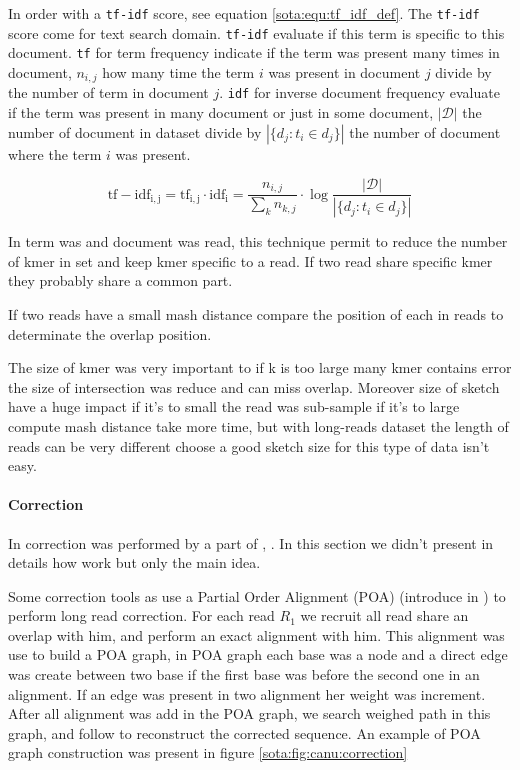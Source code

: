 \documentclass[main]{subfiles}
\begin{document}
In \mhap order \kmer with a \texttt{tf-idf} score, see equation \ref{sota:equ:tf_idf_def}. The \texttt{tf-idf} score come for text search domain. \texttt{tf-idf} evaluate if this term is specific to this document. \texttt{tf} for term frequency indicate if the term was present many times in document, $n_{i,j}$ how many time the term $i$ was present in document $j$ divide by the number of term in document $j$. \texttt{idf} for inverse document frequency evaluate if the term was present in many document or just in some document, $|\mathcal{D}|$ the number of document in dataset divide by $|\{d_{j}:t_{i}\in d_{j}\}|$ the number of document where the term $i$ was present.

\begin{equation}
\mathrm{tf-idf_{i,j}} = \mathrm{tf_{i,j}} \cdot \mathrm{idf_{i}} = \frac{n_{i,j}}{\sum_{k}n_{k,j}} \cdot \log{\frac  {|\mathcal{D}|}{|\{d_{j}:t_{i}\in d_{j}\}|}}
\label{sota:equ:tf_idf_def}
\end{equation}

In \mhap term was \kmer and document was read, this technique permit to reduce the number of kmer in set and keep kmer specific to a read. If two read share specific kmer they probably share a common part.

If two reads have a small mash distance \mhap compare the position of each \kmer in reads to determinate the overlap position.

The size of kmer was very important to if k is too large many kmer contains error the size of intersection was reduce and \mhap can miss overlap. Moreover size of sketch have a huge impact if it's to small the read was sub-sample if it's to large compute mash distance take more time, but with long-reads dataset the length of reads can be very different choose a good sketch size for this type of data isn't easy.

\paragraph{Correction}

In \canu correction was performed by a part of  \cite{falcon}, . In this section we didn't present in details how  work but only the main idea.

Some correction tools as  use a Partial Order Alignment (POA) (introduce in \cite{poa}) to perform long read correction. For each read \texttt{$R_1$} we recruit all read share an overlap with him, and perform an exact alignment with him. This alignment was use to build a POA graph, in POA graph each base was a node and a direct edge was create between two base if the first base was before the second one in an alignment. If an edge was present in two alignment her weight was increment. After all alignment was add in the POA graph, we search weighed path in this graph, and follow to reconstruct the corrected sequence. An example of POA graph construction was present in figure \ref{sota:fig:canu:correction}
\end{document}
